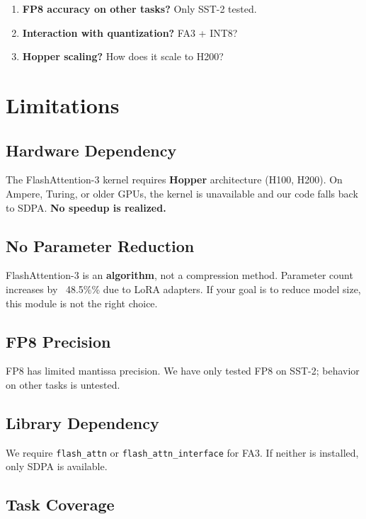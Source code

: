\begin{enumerate}
\item \textbf{FP8 accuracy on other tasks?} Only SST-2 tested.
\item \textbf{Interaction with quantization?} FA3 + INT8?
\item \textbf{Hopper scaling?} How does it scale to H200?

\end{enumerate}


\section{Limitations}

\subsection{Hardware Dependency}

The FlashAttention-3 kernel requires \textbf{Hopper} architecture (H100, H200). 
On Ampere, Turing, or older GPUs, the kernel is unavailable and our code 
falls back to SDPA. \textbf{No speedup is realized.}

\subsection{No Parameter Reduction}

FlashAttention-3 is an \textbf{algorithm}, not a compression method. Parameter 
count increases by ~48.5\%\% due to LoRA adapters. If your goal is 
to reduce model size, this module is not the right choice.

\subsection{FP8 Precision}

FP8 has limited mantissa precision. We have only tested FP8 on SST-2; 
behavior on other tasks is untested.

\subsection{Library Dependency}

We require \texttt{flash\_attn} or \texttt{flash\_attn\_interface} for FA3. If neither is 
installed, only SDPA is available.

\subsection{Task Coverage}

